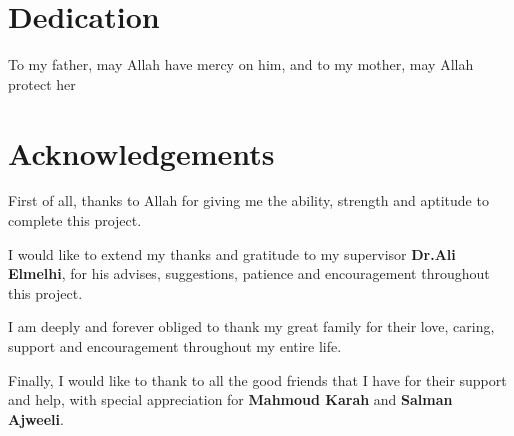 \documentclass[12pt,oneside]{book}
\begin{document}
\frontmatter

\chapter*{Dedication}
{\Large To my father, may Allah have mercy on him, and to my mother, may Allah protect her}

\chapter*{Acknowledgements}
\begin{center}
\begin{onehalfspacing}

\vspace*{0.7cm}
       
{\large 
First of all, thanks to Allah for giving me the ability, strength and aptitude to complete this project.
\vspace*{0.7cm}

I would like to extend my thanks and gratitude to my supervisor \textbf{Dr.Ali Elmelhi}, for his advises, suggestions, patience and encouragement throughout this project.
\vspace*{0.7cm}

I am deeply and forever obliged to thank my great family for their love, caring, support and encouragement throughout my entire life.
\vspace*{0.7cm}

Finally, I would like to thank to all the good friends that I have for their support and help, with special appreciation for \textbf{Mahmoud Karah} and \textbf{Salman Ajweeli}. \\
}
\end{onehalfspacing}
\end{center}
\end{document}

